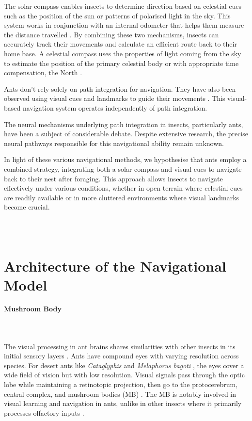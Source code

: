 \documentclass[12pt,a4paper]{article}
\begin{document}
The solar compass enables insects to determine direction based on celestial cues such as the position of the sun or patterns of polarised light in the sky. This system works in conjunction with an internal odometer that helps them measure the distance travelled \cite{wehner_2008} . By combining these two mechanisms, insects can accurately track their movements and calculate an efficient route back to their home base. A celestial compass uses the properties of light coming from the sky to estimate the position of the primary celestial body or with appropriate time compensation, the North \cite{gkanias_mitchell_stankiewicz_khan_mitra_webb_2023}. 

Ants don't rely solely on path integration for navigation. They have also been observed using visual cues and landmarks to guide their movements \cite{collett_graham_harris_2007, zeil_2012}. This visual-based navigation system operates independently of path integration.

The neural mechanisms underlying path integration in insects, particularly ants, have been a subject of considerable debate. Despite extensive research, the precise neural pathways responsible for this navigational ability remain unknown. 

In light of these various navigational methods, we hypothesise that ants employ a combined strategy, integrating both a solar compass and visual cues to navigate back to their nest after foraging. This approach allows insects to navigate effectively under various conditions, whether in open terrain where celestial cues are readily available or in more cluttered environments where visual landmarks become crucial.

\\~\\
\section{Architecture of the Navigational Model}

\paragraph{Mushroom Body}\\~\\
The visual processing in ant brains shares similarities with other insects in its initial sensory layers \cite{ardin_peng_mangan_lagogiannis_webb_2016}. Ants have compound eyes with varying resolution across species. For desert ants like \textit{Cataglyphis} \cite{zollikofer_wehner_fukushi_1995} and \textit{Melaphorus bagoti} \cite{schwarz_narendra_zeil_2011}, the eyes cover a wide field of vision but with low resolution. Visual signals pass through the optic lobe while maintaining a retinotopic projection, then go to the protocerebrum, central complex, and mushroom bodies (MB) \cite{ehmer_gronenberg_2003}. The MB is notably involved in visual learning and navigation in ants, unlike in other insects where it primarily processes olfactory inputs \cite{schürmannfw_1970}.
\end{document}
